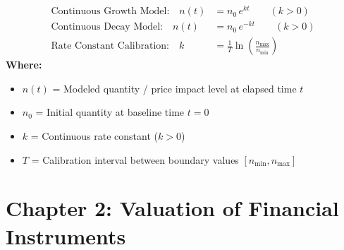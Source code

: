 \begin{formulabox}
\begin{align*}
    \text{Continuous Growth Model:} \quad n(t) &= n_0 \, e^{k t} \qquad (k > 0) \\[4pt]
    \text{Continuous Decay Model:} \quad n(t) &= n_0 \, e^{-k t} \qquad (k > 0) \\[4pt]
    \text{Rate Constant Calibration:} \quad k &= \frac{1}{T} \ln\left(\frac{n_{\max}}{n_{\min}}\right)
\end{align*}
\textbf{Where:}
\begin{itemize}[noitemsep, topsep=2pt]
    \item $n(t)$ = Modeled quantity / price impact level at elapsed time $t$
    \item $n_0$ = Initial quantity at baseline time $t = 0$
    \item $k$ = Continuous rate constant ($k > 0$)
    \item $T$ = Calibration interval between boundary values $[n_{\min}, n_{\max}]$
\end{itemize}
\end{formulabox}

\newpage
\section*{Chapter 2: Valuation of Financial Instruments}

